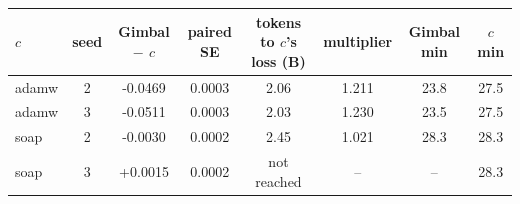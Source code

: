 \begin{tabular}{lccccccc}
\toprule
$c$ & seed & Gimbal $-$ $c$ & paired SE & tokens to $c$'s loss (B) & multiplier & Gimbal min & $c$ min \\
\midrule
adamw & 2 & -0.0469 & 0.0003 & 2.06 & 1.211 & 23.8 & 27.5 \\
adamw & 3 & -0.0511 & 0.0003 & 2.03 & 1.230 & 23.5 & 27.5 \\
soap & 2 & -0.0030 & 0.0002 & 2.45 & 1.021 & 28.3 & 28.3 \\
soap & 3 & +0.0015 & 0.0002 & not reached & -- & -- & 28.3 \\
\bottomrule
\end{tabular}
